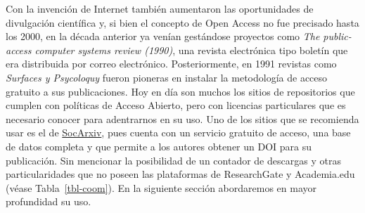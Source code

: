 \documentclass[
  spanish,
  a4paper,
  oneside]{scrbook}
\begin{document}
Con la invención de Internet también aumentaron las oportunidades de
divulgación científica y, si bien el concepto de Open Access no fue
precisado hasta los 2000, en la década anterior ya venían gestándose
proyectos como \emph{The public-access computer systems review (1990)},
una revista electrónica tipo boletín que era distribuida por correo
electrónico. Posteriormente, en 1991 revistas como \emph{Surfaces y
Psycoloquy} fueron pioneras en instalar la metodología de acceso
gratuito a sus publicaciones. Hoy en día son muchos los sitios de
repositorios que cumplen con políticas de Acceso Abierto, pero con
licencias particulares que es necesario conocer para adentrarnos en su
uso. Uno de los sitios que se recomienda usar es el de
\href{https://socopen.org/}{SocArxiv}, pues cuenta con un servicio
gratuito de acceso, una base de datos completa y que permite a los
autores obtener un DOI para su publicación. Sin mencionar la posibilidad
de un contador de descargas y otras particularidades que no poseen las
plataformas de ResearchGate y Academia.edu (véase Tabla~\ref{tbl-coom}).
En la siguiente sección abordaremos en mayor profundidad su uso.
\end{document}
